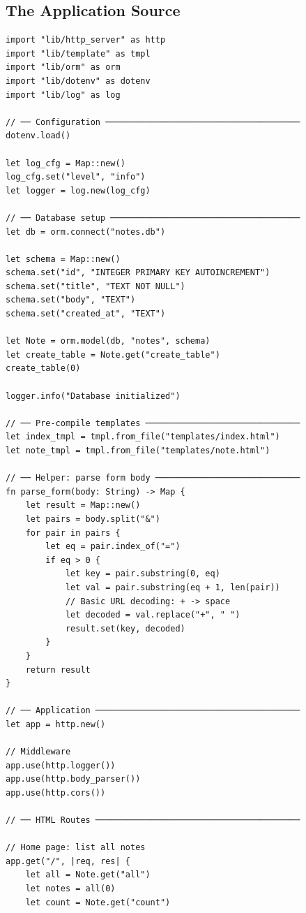 \subsection{The Application Source}\label{sec:webapp-source}

\begin{lstlisting}[language=Lattice, caption={app.lat --- Lattice Notes web application}]
import "lib/http_server" as http
import "lib/template" as tmpl
import "lib/orm" as orm
import "lib/dotenv" as dotenv
import "lib/log" as log

// ── Configuration ───────────────────────────────────────
dotenv.load()

let log_cfg = Map::new()
log_cfg.set("level", "info")
let logger = log.new(log_cfg)

// ── Database setup ──────────────────────────────────────
let db = orm.connect("notes.db")

let schema = Map::new()
schema.set("id", "INTEGER PRIMARY KEY AUTOINCREMENT")
schema.set("title", "TEXT NOT NULL")
schema.set("body", "TEXT")
schema.set("created_at", "TEXT")

let Note = orm.model(db, "notes", schema)
let create_table = Note.get("create_table")
create_table(0)

logger.info("Database initialized")

// ── Pre-compile templates ───────────────────────────────
let index_tmpl = tmpl.from_file("templates/index.html")
let note_tmpl = tmpl.from_file("templates/note.html")

// ── Helper: parse form body ─────────────────────────────
fn parse_form(body: String) -> Map {
    let result = Map::new()
    let pairs = body.split("&")
    for pair in pairs {
        let eq = pair.index_of("=")
        if eq > 0 {
            let key = pair.substring(0, eq)
            let val = pair.substring(eq + 1, len(pair))
            // Basic URL decoding: + -> space
            let decoded = val.replace("+", " ")
            result.set(key, decoded)
        }
    }
    return result
}

// ── Application ─────────────────────────────────────────
let app = http.new()

// Middleware
app.use(http.logger())
app.use(http.body_parser())
app.use(http.cors())

// ── HTML Routes ─────────────────────────────────────────

// Home page: list all notes
app.get("/", |req, res| {
    let all = Note.get("all")
    let notes = all(0)
    let count = Note.get("count")


\end{lstlisting}
